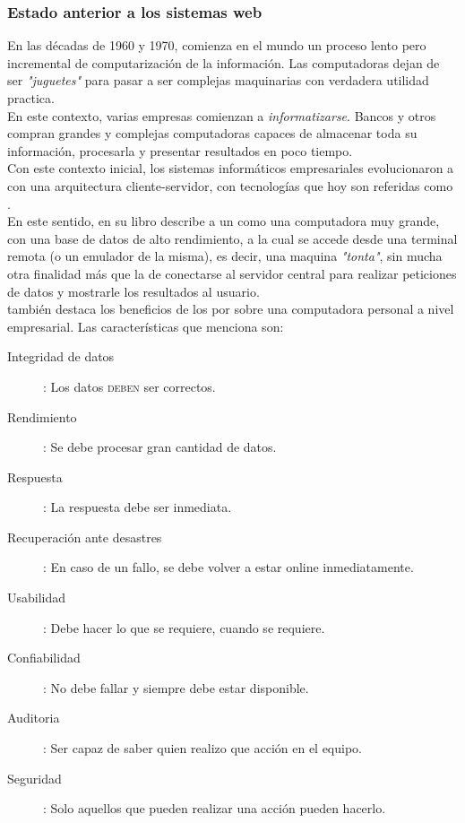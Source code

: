 \subsubsection{Estado anterior a los sistemas web}
En las décadas de 1960 y 1970, comienza en el mundo un proceso lento pero incremental de
computarización de la información. Las computadoras dejan de ser \emph{"juguetes"} para
pasar a ser complejas maquinarias con verdadera utilidad practica.\\
En este contexto, varias empresas comienzan a \emph{informatizarse}. Bancos y otros compran
grandes y complejas computadoras capaces de almacenar toda su información, procesarla y
presentar resultados en poco tiempo.\\
Con este contexto inicial, los sistemas informáticos empresariales evolucionaron a con una
arquitectura cliente-servidor, con tecnologías que hoy son referidas como \mainframes.\\
En este sentido,  en su libro
  describe a un \mainframe como
una computadora muy grande, con una base de datos de alto rendimiento, a la cual se accede
desde una terminal remota (o un emulador de la misma), es decir, una maquina
\emph{"tonta"}, sin mucha otra finalidad más que la de conectarse al servidor central para
realizar peticiones de datos y mostrarle los resultados al usuario.\\
\citeauthor{Stephens:2008:BOOK} también destaca los beneficios de los \mainframes por sobre
una computadora personal a nivel empresarial. Las características que menciona son:
\begin{description}
	\item[Integridad de datos]: Los datos \textsc{deben} ser correctos.
	\item[Rendimiento]: Se debe procesar gran cantidad de datos.
	\item[Respuesta]: La respuesta debe ser inmediata.
	\item[Recuperación ante desastres]: En caso de un fallo, se debe volver a estar online
		inmediatamente.
	\item[Usabilidad]: Debe hacer lo que se requiere, cuando se requiere.
	\item[Confiabilidad]: No debe fallar y siempre debe estar disponible.
	\item[Auditoria]: Ser capaz de saber quien realizo que acción en el equipo.
	\item[Seguridad]: Solo aquellos que pueden realizar una acción pueden hacerlo.
\end{description}
